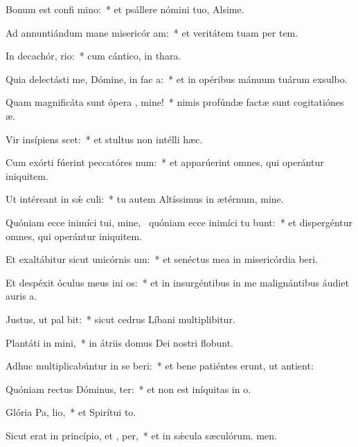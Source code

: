 \item Bonum est confi mino:~* et psállere nómini tuo, Alsime.
\item Ad annuntiándum mane misericór am:~* et veritátem tuam per tem.
\item In decachór, rio:~* cum cántico, in thara.
\item Quia delectásti me, Dómine, in fac a:~* et in opéribus mánuum tuárum exsulbo.
\item Quam magnificáta sunt ópera , mine!~* nimis profúndæ factæ sunt cogitatiónes æ.
\item Vir insípiens  scet:~* et stultus non intélli hæc.
\item Cum exórti fúerint peccatóres  num:~* et apparúerint omnes, qui operántur iniquitem.
\item Ut intéreant in sǽ culi:~* tu autem Altíssimus in ætérnum, mine.
\item Quóniam ecce inimíci tui, mine,~\pscross{} quóniam ecce inimíci tu bunt:~* et dispergéntur omnes, qui operántur iniquitem.
\item Et exaltábitur sicut unicórnis  um:~* et senéctus mea in misericórdia beri.
\item Et despéxit óculus meus ini os:~* et in insurgéntibus in me malignántibus áudiet auris a.
\item Justus, ut pal bit:~* sicut cedrus Líbani multiplibitur.
\item Plantáti in  mini,~* in átriis domus Dei nostri flobunt.
\item Adhuc multiplicabúntur in se beri:~* et bene patiéntes erunt, ut antient:
\item Quóniam rectus Dóminus,  ter:~* et non est iníquitas in o.
\item Glória Pa,  lio,~* et Spirítui to.
\item Sicut erat in princípio, et ,  per,~* et in sǽcula sæculórum. men.
